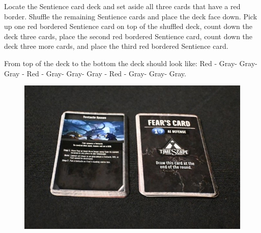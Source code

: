 \documentclass[../main.tex]{subfiles}
\begin{document}
Locate the Sentience card deck and set aside all three cards that have a red border. Shuffle the remaining Sentience cards and place the deck face down. Pick up one red bordered Sentience card on top of the shuffled deck, count down the deck three cards, place the second red bordered Sentience card, count down the deck three more cards, and place the third red bordered Sentience card. 

\clearpage

From top of the deck to the bottom the deck should look like: Red - Gray- Gray- Gray - Red - Gray- Gray- Gray - Red - Gray- Gray- Gray. 
\begin{figure}[h]
    \centering
    \includegraphics[width=1\linewidth]{chapters//boardsetup/TimeStrikeSentienceCards.jpg}
\end{figure}
\end{document}
